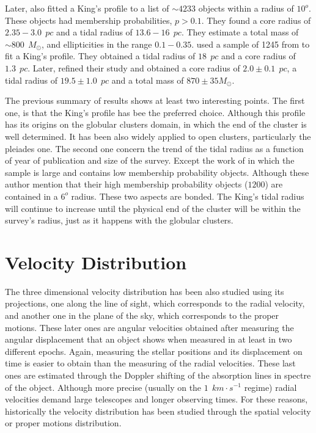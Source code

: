 Later, \citet{Adams2001} also fitted a King's profile to a list of $\sim 4233$ objects within a radius of $10^o$. These objects had membership probabilities, $p>0.1$. They found a core radius of $2.35-3.0\ \ pc$ and a tidal radius of $13.6-16\ \ pc$. They estimate a total mass of $\sim 800 \ \ M_{\odot}$, and ellipticities in the range $0.1-0.35$. \citet{Converse2008} used a sample of 1245 from \citet{Stauffer2007} to fit a King's profile. They obtained a tidal radius of $18\ \ pc$ and a core radius of  $1.3 \ \ pc$. Later, \citet{Converse2010} refined their study and obtained a core radius of $2.0\pm0.1 \ \ pc$, a tidal radius of $19.5 \pm 1.0 \ \ pc $ and a total mass of $870\pm35 M_{\odot}$.

The previous summary of results shows at least two interesting points. The first one, is that the King's profile \citep{King1962} has bee the preferred choice. Although this profile has its origins on the globular clusters domain, in which the end of the cluster is well determined. It has been also widely applied to open clusters, particularly the pleiades one. The second one concern the trend of the tidal radius as a function of year of publication and size of the survey. Except the work of \citet{Adams2001} in which the sample is large and contains low membership probability objects. Although these author mention that their high membership probability objects ($1200$) are contained in a $6^o$ radius. These two aspects are bonded. The King's tidal radius will continue to increase until the physical end of the cluster will be within the survey's radius, just as it happens with the globular clusters. 
  
\section{Velocity Distribution}

The three dimensional velocity distribution has been also studied using its projections, one along the line of sight, which corresponds to the radial velocity, and another one in the plane of the sky, which corresponds to the proper motions. These later ones are angular velocities obtained after measuring the angular displacement that an object shows when measured  in at least in two different epochs. Again, measuring the stellar positions and its displacement on time is easier to obtain than the measuring of the radial velocities. These last ones are estimated through the Doppler shifting of the absorption lines in spectre of the object. Although more precise (usually on the $1 \ \ km\cdot s^{-1}$ regime) radial velocities demand large telescopes and longer observing times. For these reasons, historically the velocity distribution has been studied through the spatial velocity or proper motions distribution. 

